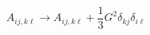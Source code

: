 \begin{equation}
A_{ij,k\ell} \rightarrow A_{ij, k\ell} + \frac{1}{3} G^2 \delta_{kj} \delta_
{i\ell}
\label{Gan}
\end{equation}

